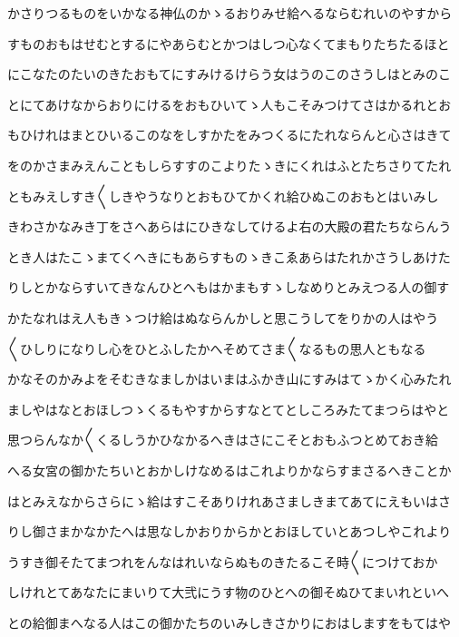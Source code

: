 \documentclass[a4paper,11pt,landscape]{ltjtarticle}
\begin{document}
\par\medskip
かさりつるものをいかなる神仏のかゝるおりみせ給へるならむれいのやすから
\par\medskip
すものおもはせむとするにやあらむとかつはしつ心なくてまもりたちたるほと
\par\medskip
にこなたのたいのきたおもてにすみけるけらう女はうのこのさうしはとみのこ
\par\medskip
とにてあけなからおりにけるをおもひいてゝ人もこそみつけてさはかるれとお
\par\medskip
もひけれはまとひいるこのなをしすかたをみつくるにたれならんと心さはきて
\par\medskip
をのかさまみえんこともしらすすのこよりたゝきにくれはふとたちさりてたれ
\par\medskip
ともみえしすき〱しきやうなりとおもひてかくれ給ひぬこのおもとはいみし
\par\medskip
きわさかなみき丁をさへあらはにひきなしてけるよ右の大殿の君たちならんう
\par\medskip
とき人はたこゝまてくへきにもあらすものゝきこゑあらはたれかさうしあけた
\par\medskip
りしとかならすいてきなんひとへもはかまもすゝしなめりとみえつる人の御す
\par\medskip
かたなれはえ人もきゝつけ給はぬならんかしと思こうしてをりかの人はやう
\par\medskip
〱ひしりになりし心をひとふしたかへそめてさま〱なるもの思人ともなる
\par\medskip
かなそのかみよをそむきなましかはいまはふかき山にすみはてゝかく心みたれ
\par\medskip
ましやはなとおほしつゝくるもやすからすなとてとしころみたてまつらはやと
\par\medskip
思つらんなか〱くるしうかひなかるへきはさにこそとおもふつとめておき給
\par\medskip
へる女宮の御かたちいとおかしけなめるはこれよりかならすまさるへきことか
\par\medskip
はとみえなからさらにゝ給はすこそありけれあさましきまてあてにえもいはさ
\par\medskip
りし御さまかなかたへは思なしかおりからかとおほしていとあつしやこれより
\par\medskip
うすき御そたてまつれをんなはれいならぬものきたるこそ時〱につけておか
\par\medskip
しけれとてあなたにまいりて大弐にうす物のひとへの御そぬひてまいれといへ
\par\medskip
との給御まへなる人はこの御かたちのいみしきさかりにおはしますをもてはや
\par\medskip
\end{document}
